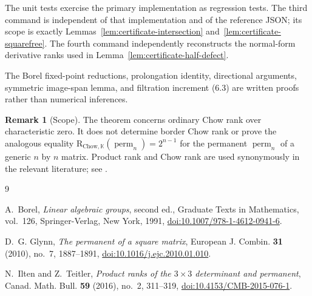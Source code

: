 \documentclass[11pt]{amsart}
\newcommand{\K}{\mathbb{K}}
\newcommand{\perm}{\operatorname{perm}}
\theoremstyle{definition}
\newtheorem{remark}[theorem]{Remark}
\begin{document}
The unit tests exercise the primary implementation as regression tests. The
third command is independent of that implementation and of the reference JSON;
its scope is exactly Lemmas~\ref{lem:certificate-intersection}
and~\ref{lem:certificate-squarefree}. The fourth command independently
reconstructs the normal-form derivative ranks used in
Lemma~\ref{lem:certificate-half-defect}.

The Borel fixed-point reductions, prolongation identity, directional
arguments, symmetric image-span lemma, and filtration increment (6.3) are
written proofs rather than numerical inferences.

\begin{remark}[Scope]
The theorem concerns ordinary Chow rank over characteristic zero. It does not
determine border Chow rank or prove the analogous equality
\(\mathrm{R}_{\mathrm{Chow},\K}(\perm_n)=2^{n-1}\) for the permanent
\(\perm_n\) of a generic \(n\) by \(n\) matrix. Product rank and Chow rank are
used synonymously in the relevant
literature; see \cite{IltenTeitler2016}.
\end{remark}

\begin{thebibliography}{9}

A.~Borel,
\emph{Linear algebraic groups}, second ed., Graduate Texts in Mathematics,
vol.~126, Springer-Verlag, New York, 1991,
\href{https://doi.org/10.1007/978-1-4612-0941-6}
{doi:10.1007/978-1-4612-0941-6}.

D.~G. Glynn,
\emph{The permanent of a square matrix},
European J. Combin. \textbf{31} (2010), no.~7, 1887--1891,
\href{https://doi.org/10.1016/j.ejc.2010.01.010}
{doi:10.1016/j.ejc.2010.01.010}.

N.~Ilten and Z.~Teitler,
\emph{Product ranks of the \(3\times3\) determinant and permanent},
Canad. Math. Bull. \textbf{59} (2016), no.~2, 311--319,
\href{https://doi.org/10.4153/CMB-2015-076-1}
{doi:10.4153/CMB-2015-076-1}.

\end{thebibliography}
\end{document}
